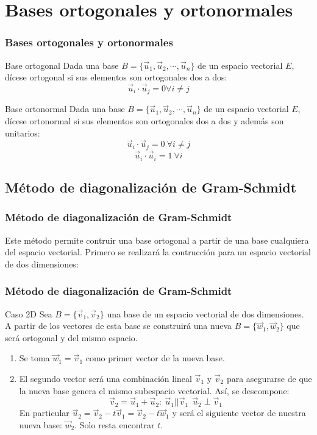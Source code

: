 \documentclass{beamer}
\begin{document}
\section{Bases ortogonales y ortonormales}
\begin{frame}
  \frametitle{Bases ortogonales y ortonormales}
\begin{block}{Base ortogonal}
Dada una base $B=\{\vec u_1,\vec u_2,\cdots,\vec u_n\}$ de un espacio vectorial $E$, d\'icese ortogonal si sus elementos son ortogonales dos a dos:
\[\vec u_i\cdot \vec u_j = 0 \forall i\neq j\]
\end{block}
\begin{block}{Base ortonormal}
Dada una base $B=\{\vec u_1,\vec u_2,\cdots,\vec u_n\}$ de un espacio vectorial $E$, d\'icese ortonormal si sus elementos son ortogonales dos a dos y adem\'as son unitarios:
\[\vec u_i\cdot \vec u_j = 0\ \forall i\neq j\]
\[\vec u_i\cdot \vec u_i = 1\ \forall i\]
\end{block}
\end{frame}

\subsection{M\'etodo de diagonalizaci\'on de Gram-Schmidt}
\begin{frame}
  \frametitle{M\'etodo de diagonalizaci\'on de Gram-Schmidt}
Este m\'etodo permite contruir una base ortogonal a partir de una base cualquiera del espacio vectorial. Primero se realizar\'a la contrucci\'on para un espacio vectorial de dos dimensiones:
\end{frame}

\begin{frame}
  \frametitle{M\'etodo de diagonalizaci\'on de Gram-Schmidt}
\begin{block}{Caso 2D}
Sea $B=\{\vec v_1,\vec v_2\}$ una base de un espacio vectorial de dos dimensiones. A partir de los vectores de esta base se construir\'a una nueva $B=\{\vec w_1,\vec w_2\}$ que ser\'a ortogonal y del mismo espacio.
\begin{enumerate}
\item Se toma $\vec w_1 = \vec v_1$ como primer vector de la nueva base.
\item El segundo vector ser\'a una combinaci\'on lineal $\vec v_1$ y $\vec v_2$ para asegurarse de que la nueva base genera el mismo subespacio vectorial. As\'i, se descompone:
\[\vec v_2 = \vec u_1+\vec u_2: \ \vec u_1||\vec v_1\ \ \vec u_2\perp\vec v_1\]
En particular $\vec u_2 = \vec v_2-t\vec v_1 = \vec v_2-t\vec w_1$ y ser\'a el siguiente vector de nuestra nueva base: $\vec w_2$. Solo resta encontrar $t$.
\end{enumerate}
\end{block}
\end{frame}
\end{document}
